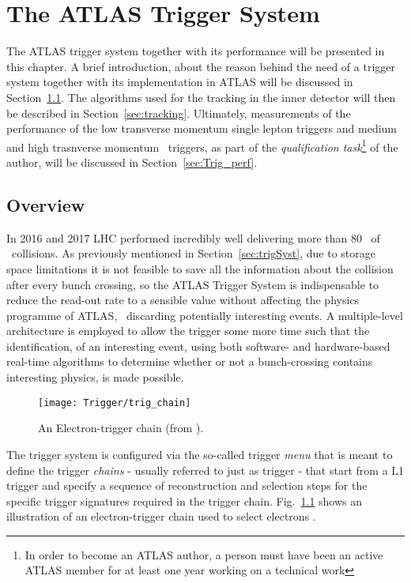 \chapter{The ATLAS Trigger System}
\label{ch:trigger}

	The ATLAS trigger system together with its performance will be presented in this chapter. A brief introduction, about the reason behind the need of a trigger system together with its implementation in ATLAS will be discussed in Section~\ref{sec:Trig_intro}. The algorithms used for the tracking in the inner detector will then be described in Section~\ref{sec:tracking}. Ultimately, measurements of the performance of the low transverse momentum single lepton triggers and medium and high trasnverse momentum \bj\ triggers, as part of the \textit{qualification task}\footnote{In order to become an ATLAS author, a person must have been an active ATLAS member for at least one year working on a technical work} of the author, will be discussed in Section~\ref{sec:Trig_perf}. 



	\section{Overview}
	\label{sec:Trig_intro}

		In 2016 and 2017 LHC performed incredibly well delivering more than 80 \ifb\ of \pp\ collisions. As previously mentioned in Section~\ref{sec:trigSyst}, due to storage space limitations it is not feasible to save all the information about the collision after every bunch crossing, so the ATLAS Trigger System is indispensable to reduce the read-out rate to a sensible value without affecting the physics programme of ATLAS, \eg\ discarding potentially interesting events. A multiple-level architecture is employed to allow the trigger some more time such that the identification, of an interesting event, using both software- and hardware-based real-time algorithms to determine whether or not a bunch-crossing contains interesting physics, is made possible. 

		\begin{figure}[!htb]
			\centering
			\texttt{[image: Trigger/trig\_chain]}
			\caption{\label{fig:trig_chain} An Electron-trigger chain (from \cite{ATLASTrigger2010}).}
		\end{figure}

		The trigger system is configured via the so-called trigger \textit{menu} that is meant to define the trigger \textit{chains} - usually referred to just as trigger - that start from a L1 trigger and specify a sequence of reconstruction and selection steps for the specific trigger signatures required in the trigger chain. Fig.~\ref{fig:trig_chain} shows an illustration of an electron-trigger chain used to select electrons \cite{ATLASTrigger2010}.

